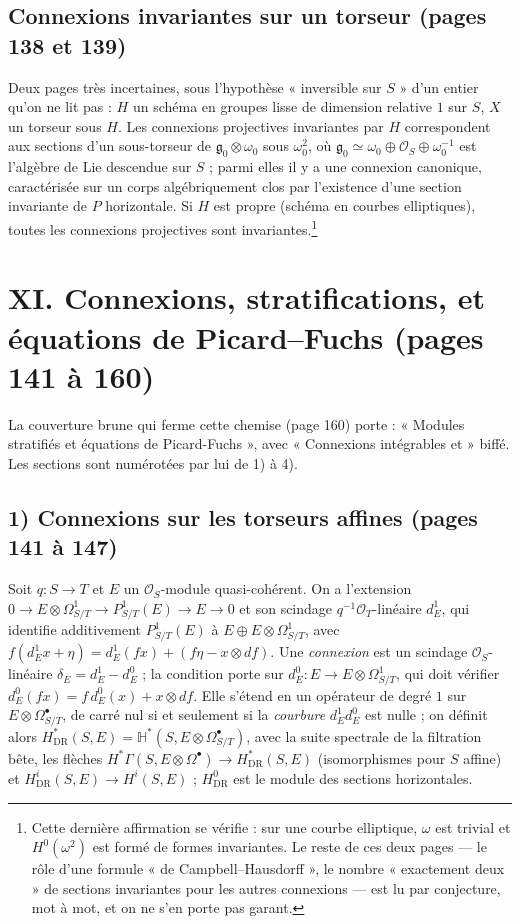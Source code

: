 \documentclass[11pt,a4paper]{article}
\begin{document}
\subsection*{Connexions invariantes sur un torseur (pages 138 et 139)}

Deux pages très incertaines, sous l'hypothèse « inversible sur $S$ » d'un
entier qu'on ne lit pas : $H$ un schéma en groupes lisse de dimension
relative $1$ sur $S$, $X$ un torseur sous $H$. Les connexions projectives
invariantes par $H$ correspondent aux sections d'un sous-torseur de
$\mathfrak{g}_0 \otimes \omega_0$ sous $\omega_0^2$, où $\mathfrak{g}_0 \simeq
\omega_0 \oplus \mathcal{O}_S \oplus \omega_0^{-1}$ est l'algèbre de Lie descendue
sur $S$ ; parmi elles il y a une connexion canonique, caractérisée sur un
corps algébriquement clos par l'existence d'une section invariante de $P$
horizontale. Si $H$ est propre (schéma en courbes elliptiques), toutes les
connexions projectives sont invariantes.\footnote{Cette dernière affirmation
se vérifie : sur une courbe elliptique, $\omega$ est trivial et
$H^0(\omega^2)$ est formé de formes invariantes. Le reste de ces deux pages
— le rôle d'une formule « de Campbell--Hausdorff », le nombre « exactement
deux » de sections invariantes pour les autres connexions — est lu par
conjecture, mot à mot, et on ne s'en porte pas garant.}

\section*{XI. Connexions, stratifications, et équations de Picard--Fuchs (pages 141 à 160)}

La couverture brune qui ferme cette chemise (page 160) porte : « Modules
stratifiés et équations de Picard-Fuchs », avec « Connexions intégrables et »
biffé. Les sections sont numérotées par lui de 1) à 4).

\subsection*{1) Connexions sur les torseurs affines (pages 141 à 147)}

Soit $q : S \to T$ et $E$ un $\mathcal{O}_S$-module quasi-cohérent. On a
l'extension $0 \to E \otimes \Omega^1_{S/T} \to P^1_{S/T}(E) \to E \to 0$ et
son scindage $q^{-1}\mathcal{O}_T$-linéaire $d^1_E$, qui identifie additivement
$P^1_{S/T}(E)$ à $E \oplus E \otimes \Omega^1_{S/T}$, avec
$f(d^1_E x + \eta) = d^1_E(fx) + (f\eta - x \otimes df)$. Une \emph{connexion}
est un scindage $\mathcal{O}_S$-linéaire $\delta_E = d^1_E - d^0_E$ ; la condition
porte sur $d^0_E : E \to E \otimes \Omega^1_{S/T}$, qui doit vérifier
$d^0_E(fx) = f\,d^0_E(x) + x \otimes df$. Elle s'étend en un opérateur de degré
$1$ sur $E \otimes \Omega^\bullet_{S/T}$, de carré nul si et seulement si la
\emph{courbure} $d^1_E d^0_E$ est nulle ; on définit alors
$H^*_{\mathrm{DR}}(S,E) = \mathbb{H}^*(S, E \otimes \Omega^\bullet_{S/T})$, avec la
suite spectrale de la filtration bête, les flèches
$H^*\Gamma(S, E\otimes\Omega^\bullet) \to H^*_{\mathrm{DR}}(S,E)$ (isomorphismes
pour $S$ affine) et $H^i_{\mathrm{DR}}(S,E) \to H^i(S,E)$ ; $H^0_{\mathrm{DR}}$ est
le module des sections horizontales.
\end{document}
